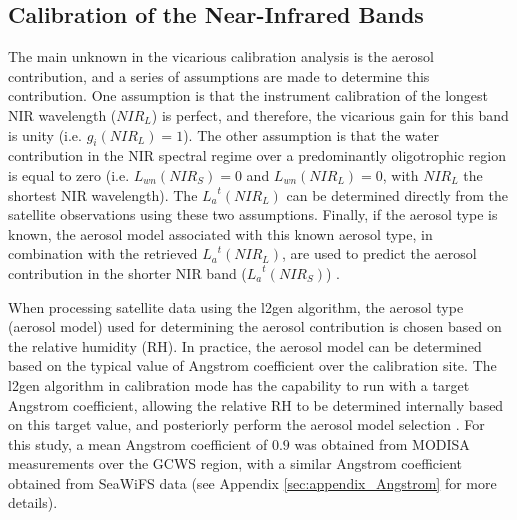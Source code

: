 \documentclass[10pt]{article}
\begin{document}

\subsection{Calibration of the Near-Infrared Bands}
\label{sec:vcal_nir}
The main unknown in the vicarious calibration analysis is the aerosol contribution, and a series of assumptions are made to determine this contribution. One assumption is that the instrument calibration of the longest NIR wavelength ($NIR_L$) is perfect, and therefore, the vicarious gain for this band is unity (i.e. $g_i(NIR_L)=1$). The other assumption is that the water contribution in the NIR spectral regime over a predominantly oligotrophic region is equal to zero (i.e. $L_{wn}(NIR_S)=0$ and $L_{wn}(NIR_L)=0$, with $NIR_L$ the shortest NIR wavelength). The ${L_a}^t(NIR_L)$ can be determined directly from the satellite observations using these two assumptions. Finally, if the aerosol type is known, the aerosol model associated with this known aerosol type, in combination with the retrieved ${L_a}^t(NIR_L)$, are used to predict the aerosol contribution in the shorter NIR band (${L_a}^t(NIR_S)$) \cite{Franz:07}. 

When processing satellite data using the l2gen algorithm, the aerosol type (aerosol model) used for determining the aerosol contribution is chosen based on the relative humidity (RH). In practice, the aerosol model can be determined based on the typical value of Angstrom coefficient over the calibration site. The l2gen algorithm in calibration mode has the capability to run with a target Angstrom coefficient, allowing the relative RH to be determined internally based on this target value, and posteriorly perform the aerosol model selection \cite{Ahmad2010,Mobley2016}. For this study, a mean Angstrom coefficient of $0.9$ was obtained from MODISA measurements over the GCWS region, with a similar Angstrom coefficient obtained from SeaWiFS data (see Appendix \ref{sec:appendix_Angstrom} for more details).
\end{document}
